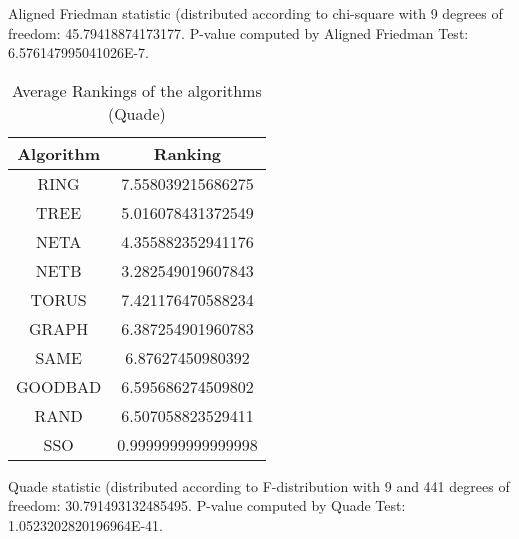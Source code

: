 \documentclass[a4paper,10pt]{article}
\begin{document}
\begin{landscape}
Aligned Friedman statistic (distributed according to chi-square with 9 degrees of freedom: 45.79418874173177. 
P-value computed by Aligned Friedman Test: 6.576147995041026E-7.\newline


\newpage

\begin{table}[!htp]
\centering
\caption{Average Rankings of the algorithms (Quade)
}\begin{tabular}{c|c}
Algorithm&Ranking\\
\hline
 RING&7.558039215686275\\
 TREE&5.016078431372549\\
 NETA&4.355882352941176\\
 NETB&3.282549019607843\\
 TORUS&7.421176470588234\\
 GRAPH&6.387254901960783\\
 SAME&6.87627450980392\\
 GOODBAD&6.595686274509802\\
 RAND&6.507058823529411\\
 SSO&0.9999999999999998\\
\end{tabular}
\end{table}
Quade statistic (distributed according to F-distribution with 9 and 441 degrees of freedom: 30.791493132485495. 
P-value computed by Quade Test: 1.0523202820196964E-41.\newline


\newpage


\end{landscape}
\end{document}

